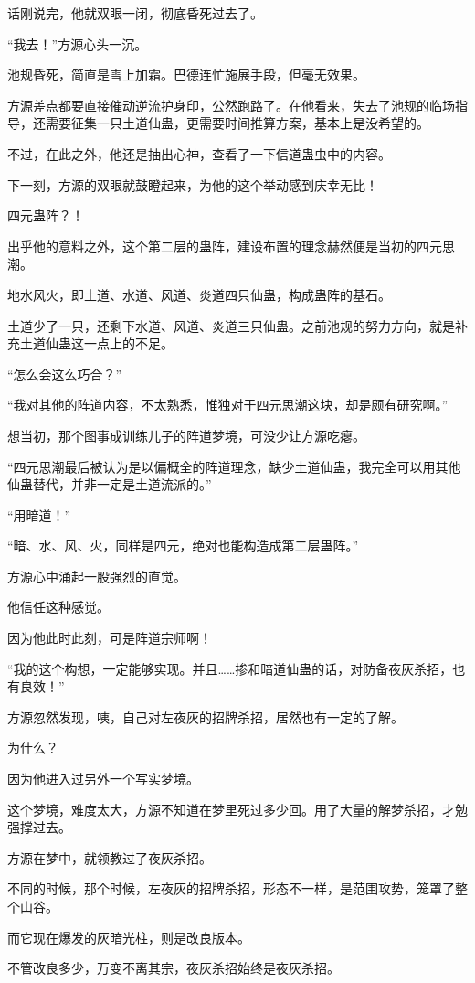 \begin{this_body}
话刚说完，他就双眼一闭，彻底昏死过去了。

“我去！”方源心头一沉。

池规昏死，简直是雪上加霜。巴德连忙施展手段，但毫无效果。

方源差点都要直接催动逆流护身印，公然跑路了。在他看来，失去了池规的临场指导，还需要征集一只土道仙蛊，更需要时间推算方案，基本上是没希望的。

不过，在此之外，他还是抽出心神，查看了一下信道蛊虫中的内容。

下一刻，方源的双眼就鼓瞪起来，为他的这个举动感到庆幸无比！

四元蛊阵？！

出乎他的意料之外，这个第二层的蛊阵，建设布置的理念赫然便是当初的四元思潮。

地水风火，即土道、水道、风道、炎道四只仙蛊，构成蛊阵的基石。

土道少了一只，还剩下水道、风道、炎道三只仙蛊。之前池规的努力方向，就是补充土道仙蛊这一点上的不足。

“怎么会这么巧合？”

“我对其他的阵道内容，不太熟悉，惟独对于四元思潮这块，却是颇有研究啊。”

想当初，那个图事成训练儿子的阵道梦境，可没少让方源吃瘪。

“四元思潮最后被认为是以偏概全的阵道理念，缺少土道仙蛊，我完全可以用其他仙蛊替代，并非一定是土道流派的。”

“用暗道！”

“暗、水、风、火，同样是四元，绝对也能构造成第二层蛊阵。”

方源心中涌起一股强烈的直觉。

他信任这种感觉。

因为他此时此刻，可是阵道宗师啊！

“我的这个构想，一定能够实现。并且……掺和暗道仙蛊的话，对防备夜灰杀招，也有良效！”

方源忽然发现，咦，自己对左夜灰的招牌杀招，居然也有一定的了解。

为什么？

因为他进入过另外一个写实梦境。

这个梦境，难度太大，方源不知道在梦里死过多少回。用了大量的解梦杀招，才勉强撑过去。

方源在梦中，就领教过了夜灰杀招。

不同的时候，那个时候，左夜灰的招牌杀招，形态不一样，是范围攻势，笼罩了整个山谷。

而它现在爆发的灰暗光柱，则是改良版本。

不管改良多少，万变不离其宗，夜灰杀招始终是夜灰杀招。


\end{this_body}
